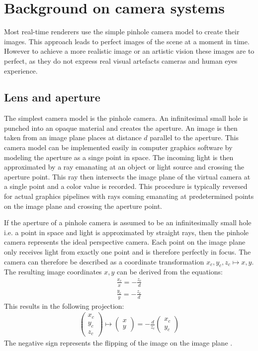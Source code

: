 \chapter{Background on camera systems}
\label{ch:background}
Most real-time renderers use the simple pinhole camera model to create their images.
This approach leads to perfect images of the scene at a moment in time.
However to achieve a more realistic image or an artistic vision these images are to perfect, as they do not express real visual artefacts cameras and human eyes experience.
\section{Lens and aperture}
\label{ch:background-lens}
The simplest camera model is the pinhole camera.
An infinitesimal small hole is punched into an opaque material and creates the aperture.
An image is then taken from an image plane places at distance $d$ parallel to the aperture.
This camera model can be implemented easily in computer graphics software by modeling the aperture as a singe point in space.
The incoming light is then approximated by a ray emanating at an object or light source and crossing the aperture point.
This ray then intersects the image plane of the virtual camera at a single point and a color value is recorded.
This procedure is typically reversed for actual graphics pipelines with rays coming emanating at predetermined points on the image plane and crossing the aperture point.

If the aperture of a pinhole camera is assumed to be an infinitesimally small hole i.e. a point in space and light is approximated by straight rays, then the pinhole camera represents the ideal perspective camera.
Each point on the image plane only receives light from exactly one point and is therefore perfectly in focus.
The camera can therefore be described as a coordinate transformation $x_c, y_c, z_c \mapsto x, y$.
The resulting image coordinates $x, y$ can be derived from the equations:
\begin{align}
    \frac{x_c}{x} = -\frac{z_c}{d} \\
    \frac{y_c}{y} = -\frac{z_c}{d}
\end{align}
This results in the following projection:
\begin{align}
    \begin{pmatrix}
    x_c \\
    y_c \\
    z_c
\end{pmatrix} 
\mapsto
\begin{pmatrix}
    x \\
    y
\end{pmatrix}
= -\frac{d}{z_c}
\begin{pmatrix}
    x_c \\
    y_c
\end{pmatrix}
\end{align}
The negative sign represents the flipping of the image on the image plane \cite{Beyerer.2016}.

